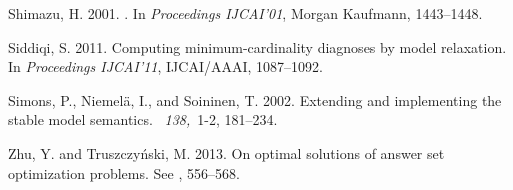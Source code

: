 \begin{thebibliography}{}
{\sc Shimazu, H.} 2001.
.
\newblock In {\em Proceedings IJCAI'01},
Morgan Kaufmann, 1443--1448.

{\sc Siddiqi, S.} 2011.
\newblock Computing minimum-cardinality diagnoses by model relaxation.
\newblock In {\em Proceedings IJCAI'11},
IJCAI/AAAI, 1087--1092.

{\sc Simons, P.}, {\sc Niemelä, I.}, {\sc and} {\sc Soininen, T.} 2002.
\newblock Extending and implementing the stable model semantics.
~{\em 138,\/}~1-2, 181--234.

{\sc Zhu, Y.} {\sc and} {\sc Truszczy{\'n}ski, M.} 2013.
\newblock On optimal solutions of answer set optimization problems.
\newblock See , 556--568.

\end{thebibliography}

